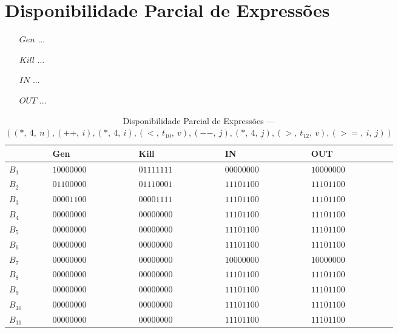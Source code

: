 \section{Disponibilidade Parcial de Express\~oes}

\begin{itemize}
  \item[$Gen$] ...
  \item[$Kill$] ...
  \item[$IN$] ...
  \item[$OUT$] ...
\end{itemize}

\begin{table}[ht]
\centering
\begin{tabular}{l|l|l|l|l}
	& Gen & Kill & IN & OUT\\
\hline
$B_{1}$ &  $10000000$ & $01111111$ & $00000000$ & $10000000$\\
$B_{2}$ &  $01100000$ & $01110001$ & $11101100$ & $11101100$\\
$B_{3}$ &  $00001100$ & $00001111$ & $11101100$ & $11101100$\\
$B_{4}$ &  $00000000$ & $00000000$ & $11101100$ & $11101100$\\
$B_{5}$ &  $00000000$ & $00000000$ & $11101100$ & $11101100$\\
$B_{6}$ &  $00000000$ & $00000000$ & $11101100$ & $11101100$\\
$B_{7}$ &  $00000000$ & $00000000$ & $10000000$ & $10000000$\\
$B_{8}$ &  $00000000$ & $00000000$ & $11101100$ & $11101100$\\
$B_{9}$ &  $00000000$ & $00000000$ & $11101100$ & $11101100$\\
$B_{10}$ &  $00000000$ & $00000000$ & $11101100$ & $11101100$\\
$B_{11}$ &  $00000000$ & $00000000$ & $11101100$ & $11101100$\\
\end{tabular}
\caption{Disponibilidade Parcial de Express\~oes --- $((*,\:4,\:n), (++,\:i), (*,\:4,\:i), (<,\:t_{10},\:v), (--,\:j), (*,\:4,\:j), (>,\:t_{12},\:v), (>=,\:i,\:j))$}
\end{table}

